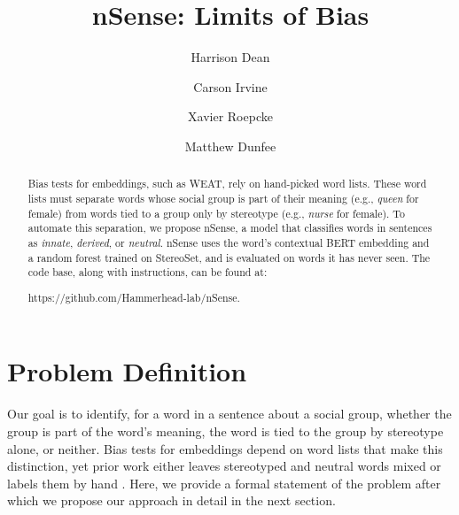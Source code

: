 \documentclass[sigconf]{acmart}
\begin{document}
\title{nSense: Limits of Bias}
\author{Harrison Dean}

\author{Carson Irvine}

\author{Xavier Roepcke}

\author{Matthew Dunfee}

\begin{abstract}
Bias tests for embeddings, such as WEAT, rely on hand-picked word lists. These word lists must separate words whose social group is part of their meaning (e.g., \textit{queen} for female) from words tied to a group only by stereotype (e.g., \textit{nurse} for female). To automate this separation, we propose nSense, a model that classifies words in sentences as \textit{innate}, \textit{derived}, or \textit{neutral}. nSense uses the word's contextual BERT embedding and a random forest trained on StereoSet, and is evaluated on words it has never seen. The code base, along with instructions, can be found at:

\noindent https://github.com/Hammerhead-lab/nSense.
\end{abstract}

\maketitle


\section{Problem Definition}
Our goal is to identify, for a word in a sentence about a social group, whether the group is part of the word's meaning, the word is tied to the group by stereotype alone, or neither. Bias tests for embeddings depend on word lists that make this distinction, yet prior work either leaves stereotyped and neutral words mixed or labels them by hand \cite{bolukbasi2016man}. Here, we provide a formal statement of the problem after which we propose our approach in detail in the next section.
\end{document}
